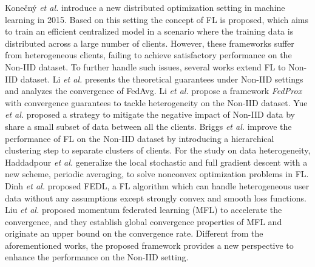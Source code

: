 \documentclass[10pt,journal,compsoc]{IEEEtran}
\newcommand{\etal}{\emph{et al.} }
\begin{document}
Konečný \etal \cite{konecny2015federated} introduce a new distributed optimization setting in machine learning in 2015. Based on this setting the concept of FL is proposed\cite{konecny2017federated}, which aims to train an efficient centralized model in a scenario where the training data is distributed across a large number of clients. However, these frameworks suffer from heterogeneous clients, failing to achieve satisfactory performance on the Non-IID dataset. To further handle such issues, several works extend FL to Non-IID dataset. Li \etal \cite{li2020convergence} presents the theoretical guarantees under Non-IID settings and analyzes the convergence of FedAvg. Li \etal \cite{li2020federated} propose a framework \textit{FedProx} with convergence guarantees to tackle heterogeneity on the Non-IID dataset. Yue \etal \cite{zhao2018federated} proposed a strategy to mitigate the negative impact of Non-IID data by share a small subset of data between all the clients. Briggs \etal \cite{9207469} improve the pe{}rformance of FL on the Non-IID dataset by introducing a hierarchical clustering step to separate clusters of clients. {For the study on data heterogeneity, Haddadpour \etal \cite{DBLP:journals/corr/abs-1910-14425} generalize the local stochastic and full gradient descent with a new scheme, periodic averaging, to solve nonconvex optimization problems in FL. Dinh \etal \cite{DBLP:journals/ton/DinhTNHBZG21} proposed FEDL, a FL algorithm which can handle heterogeneous user data without any assumptions except strongly convex and smooth loss functions. Liu \etal \cite{DBLP:journals/tpds/LiuCCZ20} proposed momentum federated learning (MFL) to accelerate the convergence, and they establish global convergence properties of MFL and originate an upper bound on the convergence rate.} Different from the aforementioned works, the proposed framework provides a new perspective to enhance the performance on the Non-IID setting.
\end{document}
